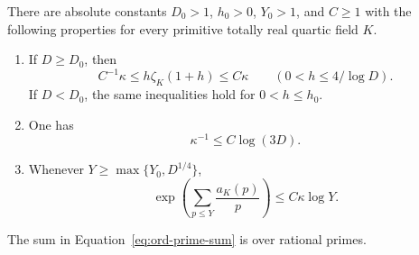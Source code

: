 \begin{lemma}\label{lem:ord-residue}
There are absolute constants \(D_0>1\), \(h_0>0\), \(Y_0>1\), and
\(C\ge1\) with the following properties for every primitive totally
real quartic field \(K\).
\begin{enumerate}
\item If \(D\ge D_0\), then
\begin{equation}\label{eq:ord-residue-comparison}
 C^{-1}\kappa\le h\zeta_K(1+h)\le C\kappa
       \qquad(0<h\le4/\log D).
\end{equation}
If \(D<D_0\), the same inequalities hold for \(0<h\le h_0\).
\item One has
\begin{equation}\label{eq:ord-residue-lower}
 \kappa^{-1}\le C\log(3D).
\end{equation}
\item Whenever \(Y\ge\max\{Y_0,D^{1/4}\}\),
\begin{equation}\label{eq:ord-prime-sum}
 \exp\left(\sum_{p\le Y}\frac{a_K(p)}p\right)
       \le C\kappa\log Y .
\end{equation}
\end{enumerate}
The sum in Equation~\eqref{eq:ord-prime-sum} is over rational primes.
\end{lemma}


